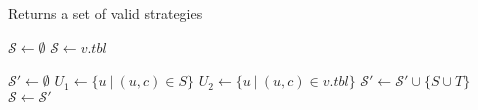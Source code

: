 \documentclass{article}
\newcommand{\strategy}{\ensuremath{\mathcal{S}}}
\newcommand{\set}[1]{\{#1\}}
\begin{document}
\begin{algorithm}
	\caption{\label{alg:valid-strategies} Returns a set of valid strategies}

	\begin{algorithmic}[1]

		\State $\strategy \leftarrow \emptyset$
			\If{$\strategy = \emptyset$}
				\State $\strategy \leftarrow v.tbl$
				\State {}
			\EndIf

			\Statex

			\State $\strategy' \leftarrow \emptyset$
			\ForAll{$S \in \strategy$}
					\State $U_1 \leftarrow \set{u~|~(u,c)\in S}$
					\State $U_2 \leftarrow \set{u~|~(u,c)\in v.tbl}$
					\Statex
						\State $\strategy' \leftarrow \strategy' \cup \set{S\cup T}$
					\EndIf
				\EndFor
			\EndFor
			\State $\strategy \leftarrow \strategy'$
		\EndFor

		\Statex
		\State\Return{$\strategy$}

		\EndProcedure

	\end{algorithmic}
\end{algorithm}
\end{document}
